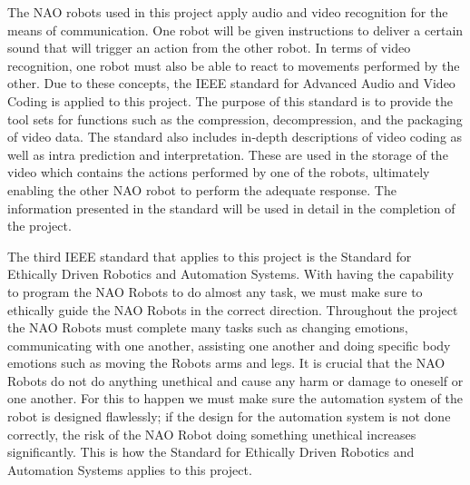 The NAO robots used in this project apply audio and video recognition for the means of communication. One robot will be given instructions to deliver a certain sound that will trigger an action from the other robot. In terms of video recognition, one robot must also be able to react to movements performed by the other. Due to these concepts, the IEEE standard for Advanced Audio and Video Coding is applied to this project. The purpose of this standard is to provide the tool sets for functions such as the compression, decompression, and the packaging of video data. The standard also includes in-depth descriptions of video coding as well as intra prediction and interpretation. These are used in the storage of the video which contains the actions performed by one of the robots, ultimately enabling the other NAO robot to perform the adequate response. The information presented in the standard will be used in detail in the completion of the project. \cite{6522104} \par 

The third IEEE standard that applies to this project is the Standard for Ethically Driven Robotics and Automation Systems. With having the capability to program the NAO Robots to do almost any task, we must make sure to ethically guide the NAO Robots in the correct direction. Throughout the project the NAO Robots must complete many tasks such as changing emotions, communicating with one another, assisting one another and doing specific body emotions such as moving the Robots arms and legs. It is crucial that the NAO Robots do not do anything unethical and cause any harm or damage to oneself or one another. For this to happen we must make sure the automation system of the robot is designed flawlessly; if the design for the automation system is not done correctly, the risk of the NAO Robot doing something unethical increases significantly. This is how the Standard for Ethically Driven Robotics and Automation Systems applies to this project. \par 

